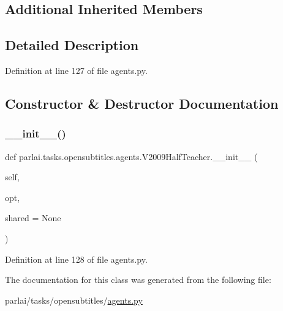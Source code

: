 \subsection*{Additional Inherited Members}


\subsection{Detailed Description}


Definition at line 127 of file agents.\+py.



\subsection{Constructor \& Destructor Documentation}
\mbox{\label{classparlai_1_1tasks_1_1opensubtitles_1_1agents_1_1V2009HalfTeacher_a9bc739825e9990d471efa003e92e52d4}} 
\subsubsection{\texorpdfstring{\+\_\+\+\_\+init\+\_\+\+\_\+()}{\_\_init\_\_()}}
{\footnotesize\ttfamily def parlai.\+tasks.\+opensubtitles.\+agents.\+V2009\+Half\+Teacher.\+\_\+\+\_\+init\+\_\+\+\_\+ (\begin{DoxyParamCaption}\item[{}]{self,  }\item[{}]{opt,  }\item[{}]{shared = {\ttfamily None} }\end{DoxyParamCaption})}



Definition at line 128 of file agents.\+py.



The documentation for this class was generated from the following file\+:\begin{DoxyCompactItemize}
\item 
parlai/tasks/opensubtitles/\hyperlink{parlai_2tasks_2opensubtitles_2agents_8py}{agents.\+py}\end{DoxyCompactItemize}
